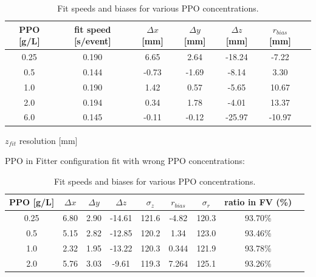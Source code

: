 \begin{table}[ht]
	\centering
	\caption{\label{partial_bias} Fit speeds and biases for various PPO concentrations.}	
	{\centering
		\begin{tabular*}{145         mm}{c@{\extracolsep{\fill}}cccccc}
			\toprule 
			PPO [g/L] & fit speed [s/event]& $\Delta x$ [mm]& $\Delta y$ [mm]& $\Delta z$ [mm] & $r_{bias}$ [mm] & \\
			\midrule
			0.25 & 0.190 &6.65 &2.64& -18.24& -7.22\\
			0.5  & 0.144 &-0.73 &-1.69& -8.14& 3.30 \\
			1.0 &0.190 & 1.42 &0.57 &-5.65& 10.67 \\
			2.0 &0.194 & 0.34 &1.78& -4.01& 13.37	\\
			6.0 &0.145 & -0.11& -0.12& -25.97& -10.97\\
			\bottomrule	
		\end{tabular*}
	}
\end{table}

$z_{fit}$ resolution [mm] 


PPO in Fitter configuration
fit with wrong PPO concentrations:  
\begin{table}[ht]
	\centering
	\caption{\label{partial_bias1} Fit speeds and biases for various PPO concentrations.}	
	{\centering
		\begin{tabular*}{140mm}{c@{\extracolsep{\fill}}cccccccc}
			\toprule 
			PPO [g/L] & $\Delta x$ & $\Delta y$ & $\Delta z$  & $\sigma_z$ & $r_{bias}$  & $\sigma_r$ & ratio in FV (\%)&\\
			\midrule
			0.25 & 6.80& 2.90& -14.61& 121.6& -4.82& 120.3& 93.70\%\\
			0.5  & 5.15& 2.82& -12.85 &120.2 &1.34 &123.0 &93.46\% \\
			1.0 &2.32 &1.95 &-13.22& 120.3& 0.344& 121.9 &93.78\% \\
			2.0 &5.76& 3.03& -9.61& 119.3& 7.264 &125.1& 93.26\% \\
			\bottomrule	
		\end{tabular*}
	}
\end{table}


